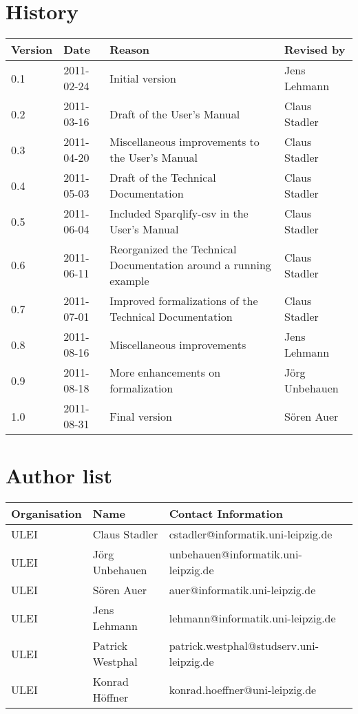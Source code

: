 \section*{History}
\begin{center}
\begin{tabular*}{\textwidth}{llp{4.44cm}l} \toprule
\textbf{Version} & \textbf{Date} & \textbf{Reason} & \textbf{Revised by} \\\midrule
0.1 & 2011-02-24 & Initial version & Jens Lehmann \\
0.2 & 2011-03-16 & Draft of the User's Manual & Claus Stadler \\
0.3 & 2011-04-20 & Miscellaneous improvements to the User's Manual & Claus Stadler \\
0.4 & 2011-05-03 & Draft of the Technical Documentation & Claus Stadler \\
0.5 & 2011-06-04 & Included Sparqlify-csv in the User's Manual  & Claus Stadler \\
0.6 & 2011-06-11 & Reorganized the Technical Documentation around a running example & Claus Stadler \\
0.7 & 2011-07-01 & Improved formalizations of the Technical Documentation & Claus Stadler \\
0.8 & 2011-08-16 & Miscellaneous improvements & Jens Lehmann \\
0.9 & 2011-08-18 & More enhancements on formalization & Jörg Unbehauen \\
1.0 & 2011-08-31 & Final version & S{\"o}ren Auer \\
\bottomrule
\end{tabular*}
\end{center}

\section*{Author list}

\begin{center}
\begin{tabular*}{\textwidth}{llp{4.44cm}l} \toprule
\textbf{Organisation} & \textbf{Name} & \textbf{Contact Information} \\\midrule
ULEI & Claus Stadler & cstadler@informatik.uni-leipzig.de \\
ULEI & J\"{o}rg Unbehauen & unbehauen@informatik.uni-leipzig.de \\
ULEI & S\"oren Auer & auer@informatik.uni-leipzig.de \\
ULEI & Jens Lehmann & lehmann@informatik.uni-leipzig.de \\
ULEI & Patrick Westphal & patrick.westphal@studserv.uni-leipzig.de \\
ULEI & Konrad H\"offner & konrad.hoeffner@uni-leipzig.de \\
\bottomrule
\end{tabular*}
\end{center}

